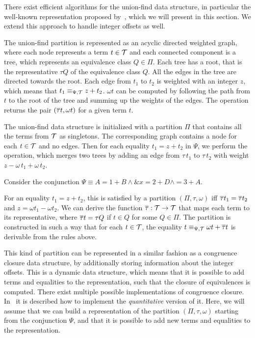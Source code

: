 There exist efficient algorithms for the union-find data structure,
in particular the well-known representation proposed by~\textcite{uf-tarjan},
which we will present in this section.
We extend this approach to handle integer offsets as well.

The union-find partition is represented as an acyclic directed weighted graph,
where each node represents a term $t \in \mathcal{T}$ and
each connected component is a tree, which represents an equivalence class $Q \in \Pi$.
Each tree has a root, that is the representative $\tau Q$ of the equivalence class $Q$.
All the edges in the tree are directed towards the root.
Each edge from $t_1$ to $t_2$ is weighted with an integer $z$,
which means that $t_1 \equiv_{\Psi,\mathcal{T}} z + t_2$.
$\omega t$ can be computed by following the path from $t$ to the root of the tree and summing up the weights of the edges.
The  operation returns the pair $(\overline{\tau} t, \omega t)$ for a given term $t$.

The union-find data structure is initialized with a partition $\Pi$ that contains all the terms from $\mathcal{T}$ as singletons.
The corresponding graph contains a node for each $t \in \mathcal{T}$ and no edges.
Then for each equality $t_1 = z + t_2$ in $\Psi$, we perform the  operation, which merges two trees by adding an edge from $\tau\,t_1$ to $\tau\,t_2$ with weight $z - \omega\,t_1 + \omega\,t_2$.


\begin{example}
Consider the conjunction $\Psi \equiv A = 1 + B \land \&x = 2 + D \land  = 3 + A$.
\end{example}

For an equality $t_1 = z + t_2$, this is satisfied by a partition $(\Pi, \tau, \omega)$ iff $\overline{\tau} t_1 = \overline{\tau} t_2$ and $z = \omega t_1 - \omega t_2$.
We can derive the function $\overline{\tau} : \mathcal{T} \rightarrow \mathcal{T}$ that maps each term to its representative, where $\overline{\tau} t = \tau Q$ if $t \in Q$ for some $Q \in \Pi$.
The partition is constructed in such a way that for each $t \in \mathcal{T}$,
the equality $t \equiv_{\Psi,\mathcal{T}} \omega t + \overline{\tau} t$ is derivable from the rules above.



This kind of partition can be represented in a similar fashion as a congruence closure data structure\cite{abstract-cc}, by additionally storing information about the integer offsets.
This is a dynamic data structure, which means that it is possible to add terms and equalities to the representation, such that the closure of equivalences is computed.
There exist multiple possible implementations of congruence closure\cite{cc-nelson, cc-shostak, cc-tarjan}.
In~\cite{2pointer} it is described how to implement the \emph{quantitative} version of it.
Here, we will assume that we can build a representation of the partition $(\Pi, \tau, \omega)$ starting from the conjunction $\Psi$, and that it is possible to add new terms and equalities to the representation.

